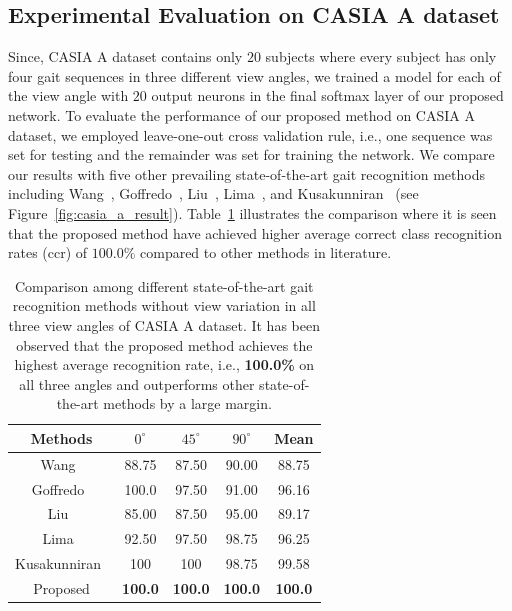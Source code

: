 \subsection{Experimental Evaluation on CASIA A dataset}
Since, CASIA A dataset contains only $ 20 $ subjects where every subject has only four gait sequences in three different view angles, we trained a model for each of the view angle with $ 20 $ output neurons in the final softmax layer of our proposed network. To evaluate the performance of our proposed method on CASIA A dataset, we employed leave-one-out cross validation rule, i.e., one sequence was set for testing and the remainder was set for training the network. We compare our results with five other prevailing state-of-the-art gait recognition methods including Wang~\cite{Wang_03}, Goffredo~\cite{Goffredo_08}, Liu~\cite{Liu_16}, Lima~\cite{Lima_19}, and Kusakunniran~\cite{Kusakunniran_09} (see Figure~\ref{fig:casia_a_result}). Table~\ref{table:casia_a_result} illustrates the comparison where it is seen that the proposed method have achieved higher average correct class recognition rates (\gls{ccr}) of $100.0\%$ compared to other methods in literature.


\begin{table}
	\centering
	\caption [Comparison among different state-of-the-art gait recognition methods without view variation in all three view angles of CASIA A dataset]
	{Comparison among different state-of-the-art gait recognition methods without view variation in all three view angles of CASIA A dataset. It has been observed that the proposed method achieves the highest average recognition rate, i.e., \textbf{100.0\%} on all three angles and outperforms other state-of-the-art methods by a large margin. \label{table:casia_a_result}}
	{\begin{tabular*}{30pc}{@{\extracolsep{\fill}}ccccc}\hline
			
			Methods &${0^{\circ}}$ &${45^{\circ}}$   &${90^{\circ}}$  &Mean\\
			\hline
			
			Wang~\cite{Wang_03} &88.75 &87.50 &90.00 &88.75\\
			
			\noalign{\smallskip}
			Goffredo~\cite{Goffredo_08} &100.0 &97.50 &91.00 &96.16\\ 
			
			\noalign{\smallskip}
			Liu~\cite{Liu_16} &85.00 &87.50 &95.00 &89.17\\ 
			
			\noalign{\smallskip}
			Lima~\cite{Lima_19} &92.50 &97.50 &98.75 &96.25 \\
			
			\noalign{\smallskip}
			Kusakunniran~\cite{Kusakunniran_09} &100  &100  &98.75 &99.58 \\
			
			\noalign{\smallskip}
			Proposed &{\textbf{100.0}} & {\textbf{100.0}} &{\textbf{100.0}} & {\textbf{100.0}}\\
			\hline
	\end{tabular*}}{}
\end{table}


